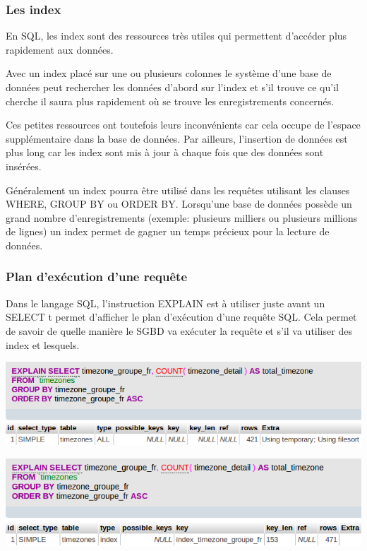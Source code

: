 \begin{frame}
    \frametitle{Les index}

    En SQL, les index sont des ressources très utiles qui permettent d’accéder plus rapidement aux données.

    Avec un index placé sur une ou plusieurs colonnes le système d’une base de données peut
    rechercher les données d’abord sur l’index
    et s’il trouve ce qu’il cherche il saura plus rapidement
    où se trouve les enregistrements concernés.

    Ces petites ressources ont toutefois leurs inconvénients
    car cela occupe de l’espace supplémentaire dans la base de données.
    Par ailleurs, l’insertion de données est plus long
    car les index sont mis à jour à chaque fois que des données sont insérées.

    Généralement un index pourra être utilisé dans les requêtes utilisant
    les clauses WHERE, GROUP BY ou ORDER BY.
    Lorsqu’une base de données possède un grand nombre d’enregistrements
    (exemple: plusieurs milliers ou plusieurs millions de lignes)
    un index permet de gagner un temps précieux pour la lecture de données.

\end{frame}


\begin{frame}
    \frametitle{Plan d'exécution d'une requête}

    Dans le langage SQL,
    l’instruction EXPLAIN est à utiliser juste avant un SELECT
    t permet d’afficher le plan d’exécution d’une requête SQL.
    Cela permet de savoir de quelle manière le SGBD va exécuter la requête
    et s’il va utiliser des index et lesquels.

    \centering
    \smallskip
    \includegraphics[width=0.7\linewidth]{figures/persistence/explain-1}

    \smallskip
    \includegraphics[width=0.7\linewidth]{figures/persistence/explain-2}
\end{frame}

